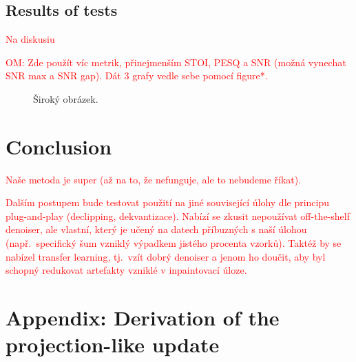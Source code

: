 \documentclass[conference]{IEEEtran}
\newcommand{\todo}[1]{\textcolor{red}{#1}}
\begin{document}
\subsection{Results of tests}

\todo{Na diskusiu}

\todo{OM: Zde použít víc metrik, přinejmenším STOI, PESQ a SNR (možná vynechat SNR max a SNR gap). Dát 3 grafy vedle sebe pomocí figure*.}

\begin{figure*}
	\caption{Široký obrázek.}
\end{figure*}

\section{Conclusion}
\label{sec:conclusion}

\todo{Naše metoda je super (až na to, že nefunguje, ale to nebudeme říkat).}

\todo{Dalším postupem bude testovat použití na jiné související úlohy dle principu plug-and-play (declipping, dekvantizace). Nabízí se zkusit nepoužívat off-the-shelf denoiser, ale vlastní, který je učený na datech příbuzných s naší úlohou (např.\ specifický šum vzniklý výpadkem jistého procenta vzorků). Taktéž by se nabízel transfer learning, tj.\ vzít dobrý denoiser a jenom ho doučit, aby byl schopný redukovat artefakty vzniklé v inpaintovací úloze.}

\section*{Appendix: Derivation of the projection-like update}
\end{document}
